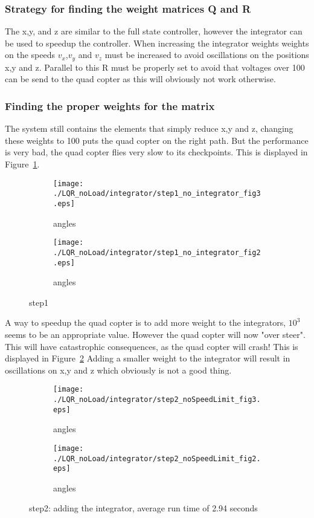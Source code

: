 \subsubsection{Strategy for finding the weight matrices Q and R}
The x,y, and z are similar to the full state controller, however the integrator can be used to speedup the controller. When increasing the integrator weights weights on the speeds $v_x$,$v_y$ and $v_z$ must be increased to avoid oscillations on the positions x,y and z. Parallel to this R must be properly set to avoid that voltages over 100 can be send to the quad copter as this will obviously not work otherwise.

\subsubsection{Finding the proper weights for the matrix}
The system still contains the elements that simply reduce x,y and z, changing these weights to 100 puts the quad copter on the right path. But the performance is very bad, the quad copter flies very slow to its checkpoints. This is displayed in Figure~\ref{fig:step1 integrator}.

\begin{figure}[H]
	\centering
	\begin{subfigure}[b]{0.3\textwidth}
		\texttt{[image: ./LQR\_noLoad/integrator/step1\_no\_integrator\_fig3.eps]}
		\caption{angles}
	\end{subfigure}
	\begin{subfigure}[b]{0.3\textwidth}
		\texttt{[image: ./LQR\_noLoad/integrator/step1\_no\_integrator\_fig2.eps]}
		\caption{angles}
	\end{subfigure}
	\caption{step1}\label{fig:step1 integrator}
\end{figure}

A way to speedup the quad copter is to add more weight to the integrators, $10^3$ seems to be an appropriate value. However the quad copter will now "over steer". This will have catastrophic consequences, as the quad copter will  crash! This is displayed in Figure~\ref{fig:step2 integrator} Adding a smaller weight to the integrator will result in oscillations on x,y and z which obviously is not a good thing.

\begin{figure}[H]
	\centering
	\begin{subfigure}[b]{0.3\textwidth}
		\texttt{[image: ./LQR\_noLoad/integrator/step2\_noSpeedLimit\_fig3.eps]}
		\caption{angles}
	\end{subfigure}
	\begin{subfigure}[b]{0.3\textwidth}
		\texttt{[image: ./LQR\_noLoad/integrator/step2\_noSpeedLimit\_fig2.eps]}
		\caption{angles}
	\end{subfigure}
	\caption{step2: adding the integrator, average run time of 2.94 seconds}\label{fig:step2 integrator}
\end{figure}

